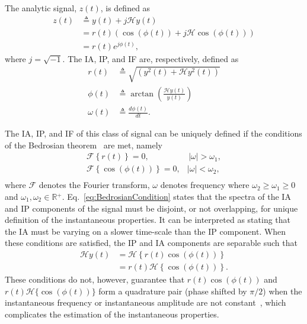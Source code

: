 \documentclass[a4paper]{IEEEtran}
\begin{document}
The analytic signal, $z(t)$, is defined as
\begin{align}\label{eq:AnalyticSignal}
	z\left( t \right) &\triangleq y\left( t \right) + j\mathcal{H}y\left( t \right) \\
    &= r\left( t \right)\left(\cos\left(\phi\left(t\right)\right) + j \mathcal{H}\cos\left(\phi\left(t\right)\right)\right) \\
&= r\left( t \right){e^{j\phi \left( t \right)}},
\end{align}
where $j=\sqrt{-1}$. The IA, IP, and IF are, respectively, defined as
\begin{align}
	r(t) &\triangleq \sqrt{\left(y^2(t) + \mathcal{H}y^2(t)\right)}\label{eq:IAdef}\\
	\phi(t) &\triangleq \arctan\left(\frac{\mathcal{H}y\left( t \right)}{y\left(t\right)}\right) \label{eq:IPdef}\\
\omega \left( t \right) &\triangleq \frac{d\phi \left( t \right)}{dt}. \label{eq:IFdef}
\end{align}

The IA, IP, and IF of this class of signal can be uniquely defined if the conditions of the Bedrosian theorem~\cite{Bedrosian1963} are met, namely
\begin{equation}\label{eq:BedrosianCondition}
\begin{array}{*{20}{c}}
   {\mathcal{F}\left\{ {r\left( t \right)} \right\} = 0,} & {\,\left| \omega \right| > \omega_1,}  \\
   {\mathcal{F}\left\{ {\cos\left(\phi \left( t \right)\right)} \right\} = 0,} & {\left| \omega \right| < \omega_2,}  \\
\end{array}
\end{equation}
where $\mathcal{F}$ denotes the Fourier transform, $\omega$ denotes frequency where $\omega_2 \ge \omega_1 \ge 0$ and $\omega_1,\omega_2 \in \mathbb{R}{^ + }$. Eq.~\ref{eq:BedrosianCondition} states that the spectra of the IA and IP components of the signal must be disjoint, or not overlapping, for unique definition of the instantaneous properties. It can be interpreted as stating that the IA must be varying on a slower time-scale than the IP component. When these conditions are satisfied, the IP and IA components are separable such that
\begin{align}\label{eq:SepAmpandPhase}
   \mathcal{H}y\left( t \right) &= \mathcal{H}\left\{ {r\left( t \right)\cos \left( {\phi \left( t \right)} \right)} \right\} \nonumber \\
   &= r\left( t \right)\mathcal{H}\left\{ {\cos \left( {\phi \left( t \right)} \right)} \right\}.
\end{align}
These conditions do not, however, guarantee that $r\left(t\right)\cos(\phi(t))$ and $r\left(t\right)\mathcal{H}\{\cos(\phi(t))\}$ form a quadrature pair (phase shifted by $\pi/2$) when the instantaneous frequency or instantaneous amplitude are not constant~\cite{Nuttall1966}, which complicates the estimation of the instantaneous properties. 
\end{document}
